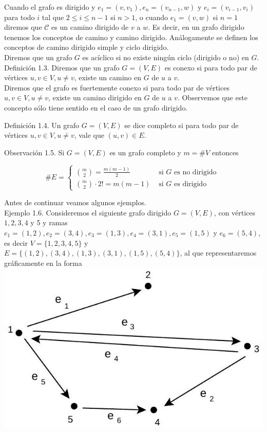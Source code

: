 \documentclass[10pt]{article}
\begin{document}
Cuando el grafo es dirigido y $e_{1}=\left(v, v_{1}\right), e_{n}=\left(v_{n-1}, w\right)$ y $e_{i}=\left(v_{i-1}, v_{i}\right)$ para todo $i$ tal que $2 \leq i \leq n-1$ si $n>1$, o cuando $e_{1}=(v, w)$ si $n=1$ diremos que $\mathcal{C}$ es un camino dirigido de $v$ a $w$. Es decir, en un grafo dirigido tenemos los conceptos de camino y camino dirigido. Análogamente se definen los conceptos de camino dirigido simple y ciclo dirigido.\\
Diremos que un grafo $G$ es acíclico si no existe ningún ciclo (dirigido o no) en $G$.\\
Definición 1.3. Diremos que un grafo $G=(V, E)$ es conexo si para todo par de vértices $u, v \in V, u \neq v$, existe un camino en $G$ de $u$ a $v$.\\
Diremos que el grafo es fuertemente conexo si para todo par de vértices $u, v \in V, u \neq v$, existe un camino dirigido en $G$ de $u$ a $v$. Observemos que este concepto sólo tiene sentido en el caso de un grafo dirigido.

Definición 1.4. Un grafo $G=(V, E)$ se dice completo si para todo par de vértices $u, v \in V, u \neq v$, vale que $(u, v) \in E$.

Observación 1.5. Si $G=(V, E)$ es un grafo completo y $m=\# V$ entonces

$$
\# E= \begin{cases}\binom{m}{2}=\frac{m(m-1)}{2} & \text { si } G \text { es no dirigido } \\ \binom{m}{2} \cdot 2!=m(m-1) & \text { si } G \text { es dirigido }\end{cases}
$$

Antes de continuar veamos algunos ejemplos.\\
Ejemplo 1.6. Consideremos el siguiente grafo dirigido $G=(V, E)$, con vértices $1,2,3,4$ y 5 y ramas $e_{1}=(1,2), e_{2}=(3,4), e_{3}=(1,3), e_{4}=(3,1), e_{5}=(1,5)$ y $e_{6}=(5,4)$, es decir $V=\{1,2,3,4,5\}$ y $E=\{(1,2),(3,4),(1,3),(3,1),(1,5),(5,4)\}$, al que representaremos gráficamente en la forma\\
\includegraphics[max width=\textwidth, center]{2025_09_05_93c7c1835f249f70c0eeg-02}
\end{document}
